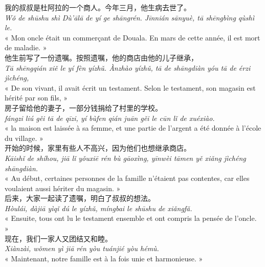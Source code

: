 \documentclass[11pt]{article}
\begin{document}
\begin{textebox}
我的叔叔是杜阿拉的一个商人。今年三月，他生病去世了。\\
\emph{Wǒ de shūshu shì Dù'ālā de yí ge shāngrén. Jīnnián sānyuè, tā shēngbìng qùshì le.}\\
« Mon oncle était un commerçant de Douala. En mars de cette année, il est mort de maladie. »\\[4pt]
他生前写了一份遗嘱。按照遗嘱，他的商店由他的儿子继承，\\
\emph{Tā shēngqián xiě le yí fèn yízhǔ. Ànzhào yízhǔ, tā de shāngdiàn yóu tā de érzi jìchéng,}\\
« De son vivant, il avait écrit un testament. Selon le testament, son magasin est hérité par son fils, »\\[4pt]
房子留给他的妻子，一部分钱捐给了村里的学校。\\
\emph{fángzi liú gěi tā de qīzi, yí bùfen qián juān gěi le cūn lǐ de xuéxiào.}\\
« la maison est laissée à sa femme, et une partie de l'argent a été donnée à l'école du village. »\\[4pt]
开始的时候，家里有些人不高兴，因为他们也想继承商店。\\
\emph{Kāishǐ de shíhou, jiā lǐ yǒuxiē rén bù gāoxìng, yīnwèi tāmen yě xiǎng jìchéng shāngdiàn.}\\
« Au début, certaines personnes de la famille n'étaient pas contentes, car elles voulaient aussi hériter du magasin. »\\[4pt]
后来，大家一起读了遗嘱，明白了叔叔的想法。\\
\emph{Hòulái, dàjiā yìqǐ dú le yízhǔ, míngbai le shūshu de xiǎngfǎ.}\\
« Ensuite, tous ont lu le testament ensemble et ont compris la pensée de l'oncle. »\\[4pt]
现在，我们一家人又团结又和睦。\\
\emph{Xiànzài, wǒmen yì jiā rén yòu tuánjié yòu hémù.}\\
« Maintenant, notre famille est à la fois unie et harmonieuse. »
\end{textebox}
\end{document}
